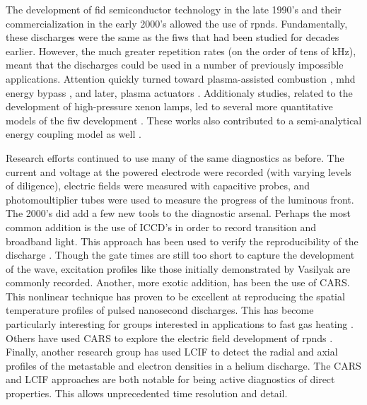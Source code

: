 The development of fid semiconductor technology in the late 1990's and their
commercialization in the early 2000's allowed the use of rpnds. Fundamentally,
these discharges were the same as the fiws that had been studied for decades
earlier. However, the much greater repetition rates (on the order of tens of
kHz), meant that the discharges could be used in a number of previously
impossible applications. Attention quickly turned toward plasma-assisted
combustion \cite{Starikovskaia2006}, mhd energy bypass \cite{Macheret2002}, and
later, plasma actuators \cite{Adamovich2009}. Additionaly studies, related to
the development of high-pressure xenon lamps, led to several more quantitative
models of the fiw development \cite{Nikandrov2008, Tsendin2009}. These works
also contributed to a semi-analytical energy coupling model as well
\cite{Adamovich2009}.

Research efforts continued to use many of the same diagnostics as before. The
current and voltage at the powered electrode were recorded (with varying levels
of diligence), electric fields were measured with capacitive probes, and
photomoultiplier tubes were used to measure the progress of the luminous front.
The 2000's did add a few new tools to the diagnostic arsenal. Perhaps the most
common addition is the use of ICCD's in order to record transition and broadband
light. This approach has been used to verify the reproducibility of the
discharge \cite{Adamovich2009}. Though the gate times are still too short to
capture the development of the wave, excitation profiles like those initially
demonstrated by Vasilyak\cite{Vasilyak1994} are commonly recorded. Another, more
exotic addition, has been the use of CARS. This nonlinear technique has proven
to be excellent at reproducing the spatial temperature profiles of pulsed
nanosecond discharges. This has become particularly interesting for groups
interested in applications to fast gas heating \cite{Zuzeek2010}. Others have
used CARS to explore the electric field development of rpnds \cite{Ito2010,
Ito2010a}. Finally, another research group has used LCIF to detect the radial
and axial profiles of the metastable and electron densities in a helium
discharge. The CARS and LCIF approaches are both notable for being active
diagnostics of direct properties. This allows unprecedented time resolution and
detail.



